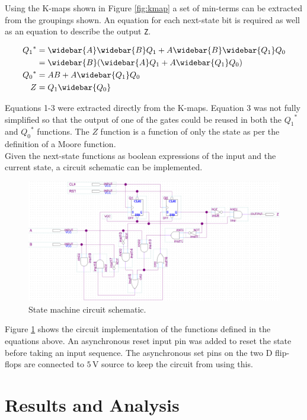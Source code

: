 \documentclass[CMPE]{KGCOEReport}
\begin{document}
Using the K-maps shown in Figure \ref{fig:kmap} a set of min-terms can be extracted from the groupings shown. An equation for each next-state bit is required as well as an equation to describe the output \texttt{Z}.

\begin{align}
{Q_1}^* &= \widebar{A}\widebar{B}Q_1 + A\widebar{B}\widebar{Q_1}Q_0\\
&= \widebar{B}(\widebar{A}Q_1 + A\widebar{Q_1}Q_0)\\
{Q_0}^* &= AB + A\widebar{Q_1}Q_0\\
Z &= Q_1\widebar{Q_0}
\end{align}

Equations 1-3 were extracted directly from the K-maps. Equation 3 was not fully simplified so that the output of one of the gates could be reused in both the ${Q_1}^*$ and ${Q_0}^*$ functions. The $Z$ function is a function of only the state as per the definition of a Moore function.\\

Given the next-state functions as boolean expressions of the input and the current state, a circuit schematic can be implemented.

\begin{figure}[h!]
	\centering
	\includegraphics[width=\textwidth]{schematic}
	\caption{State machine circuit schematic.}
	\label{fig:schem-aoi}
\end{figure}

Figure \ref{fig:schem-aoi} shows the circuit implementation of the functions defined in the equations above. An asynchronous reset input pin was added to reset the state before taking an input sequence. The asynchronous set pins on the two D flip-flops are connected to $5\,\si\volt$ source to keep the circuit from using this.

\section*{Results and Analysis}
\end{document}
